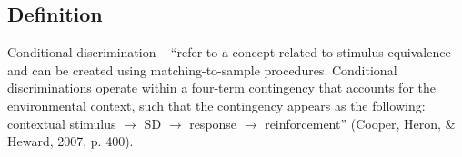 \subsection{Definition}
Conditional discrimination – ``refer to a concept related to stimulus equivalence and can be created using matching-to-sample procedures.  Conditional discriminations operate within a four-term contingency that accounts for the environmental context, such that the contingency appears as the following: contextual stimulus $\rightarrow$ SD $\rightarrow$ response $\rightarrow$ reinforcement'' (Cooper, Heron, \& Heward, 2007, p. 400).\\

